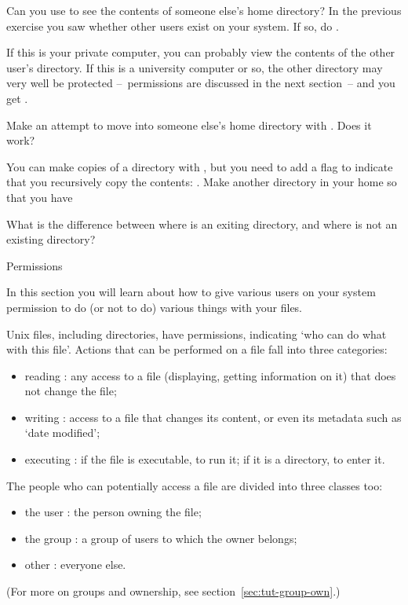 \begin{exercise}
  Can you use  to see the contents of someone else's home
  directory? In the previous exercise you saw whether other users
  exist on your system. If so, do .
\end{exercise}
\begin{outcome}
  If this is your private computer, you can probably view the contents
  of the other user's directory. If this is a university computer or
  so, the other directory may very well be protected --~permissions
  are discussed in the next section~-- and
  you get .
\end{outcome}

Make an attempt to move into someone else's home directory with
. Does it work?

You can make copies of a directory with , but you need to add a
flag to indicate that you recursively copy the contents: . Make another directory  in your home so that you have


What is the difference between
where  is an exiting directory,
and
where  is not an
existing directory?

 {Permissions}
\label{sec:unix-permissions}

\begin{purpose}
  In this section you will learn about how to give various users on
  your system permission to do (or not to do) various things with your
  files.
\end{purpose}

Unix files, including directories,
have permissions, indicating `who can do what with this
file'. Actions that can be performed on a file fall into three
categories:
\begin{itemize}
\item reading : any access to a file (displaying, getting information
  on it) that does not change the file;
\item writing : access to a file that changes its content, or even its
  metadata such as `date modified';
\item executing : if the file is executable, to run it; if it is a
  directory, to enter it.
\end{itemize}
The people who can potentially access a file are divided into three
classes too:
\begin{itemize}
\item the user : the person owning the file;
\item the group : a group of users to which the owner belongs;
\item other : everyone else.
\end{itemize}
(For more on groups and ownership, see section~\ref{sec:tut-group-own}.)

